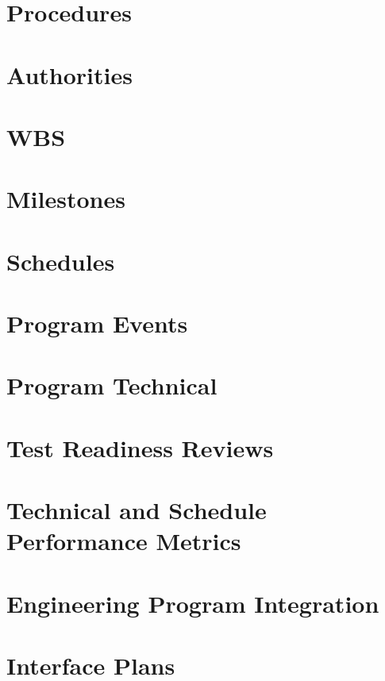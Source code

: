 \section{Procedures}

\section{Authorities}

\section{WBS}

\section{Milestones}

\section{Schedules}

\section{Program Events}

\section{Program Technical}

\section{Test Readiness Reviews}

\section{Technical and Schedule Performance Metrics}

\section{Engineering Program Integration}

\section{Interface Plans}
